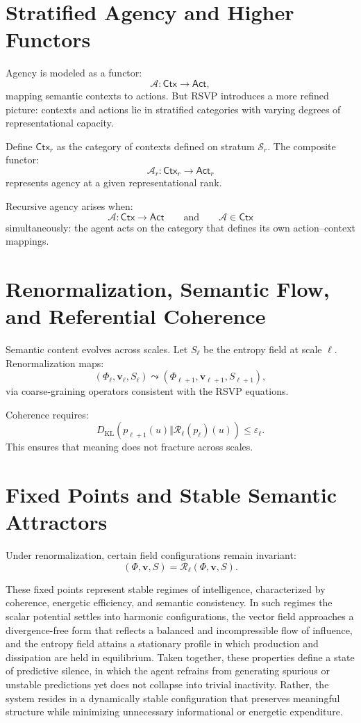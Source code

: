 \documentclass[12pt]{article}
\theoremstyle{plain}
\theoremstyle{definition}
\theoremstyle{remark}
\newcommand{\Stratum}{\mathcal{S}}
\begin{document}
\section{Stratified Agency and Higher Functors}

Agency is modeled as a functor:
\[
\mathcal{A} : \mathsf{Ctx} \to \mathsf{Act},
\]
mapping semantic contexts to actions. But RSVP introduces a more refined
picture: contexts and actions lie in stratified categories with varying 
degrees of representational capacity.

Define $\mathsf{Ctx}_r$ as the category of contexts defined on stratum 
$\Stratum_r$. The composite functor:
\[
\mathcal{A}_r : \mathsf{Ctx}_r \to \mathsf{Act}_r
\]
represents agency at a given representational rank.

Recursive agency arises when:
\[
\mathcal{A} : \mathsf{Ctx} \to \mathsf{Act}
\qquad\text{and}\qquad
\mathcal{A} \in \mathsf{Ctx}
\]
simultaneously: the agent acts on the category that defines its own 
action–context mappings.

\section{Renormalization, Semantic Flow, and Referential Coherence}

Semantic content evolves across scales. Let $S_\ell$ be the entropy field at 
scale $\ell$. Renormalization maps:
\[
(\Phi_\ell, \mathbf{v}_\ell, S_\ell)
\leadsto
(\Phi_{\ell+1}, \mathbf{v}_{\ell+1}, S_{\ell+1}),
\]
via coarse-graining operators consistent with the RSVP equations.

Coherence requires:
\[
D_{\mathrm{KL}}(
p_{\ell+1}(u)
\Vert 
\mathcal{R}_\ell(p_\ell)(u)
)
\le \varepsilon_\ell.
\]
This ensures that meaning does not fracture across scales.

\section{Fixed Points and Stable Semantic Attractors}

Under renormalization, certain field configurations remain invariant:
\[
(\Phi,\mathbf{v},S)
= \mathcal{R}_\ell(\Phi,\mathbf{v},S).
\]

These fixed points represent stable regimes of intelligence, characterized by coherence, energetic efficiency, and semantic consistency. In such regimes the scalar potential settles into harmonic configurations, the vector field approaches a divergence-free form that reflects a balanced and incompressible flow of influence, and the entropy field attains a stationary profile in which production and dissipation are held in equilibrium. Taken together, these properties define a state of predictive silence, in which the agent refrains from generating spurious or unstable predictions yet does not collapse into trivial inactivity. Rather, the system resides in a dynamically stable configuration that preserves meaningful structure while minimizing unnecessary informational or energetic expenditure.
\end{document}

